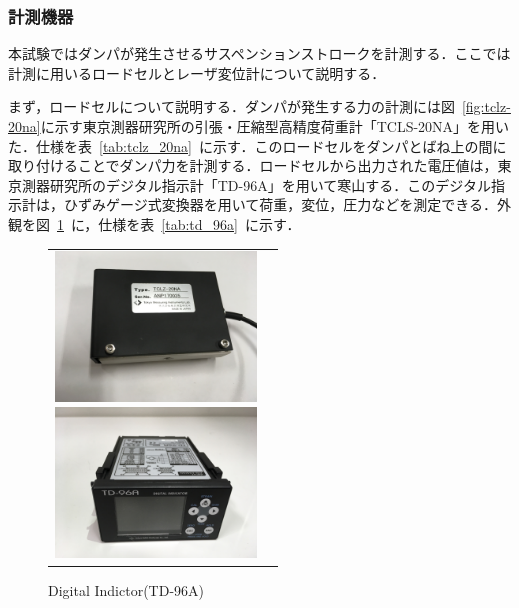 \documentclass[a4paper,12pt]{article_vdlab_sotsuron}
\begin{document}
\subsubsection{計測機器}
本試験ではダンパが発生させるサスペンションストロークを計測する．ここでは計測に用いるロードセルとレーザ変位計について説明する．

まず，ロードセルについて説明する．ダンパが発生する力の計測には図~\ref{fig:tclz-20na}に示す東京測器研究所の引張・圧縮型高精度荷重計「TCLS-20NA」を用いた．仕様を表~\ref{tab:tclz_20na}~に示す．このロードセルをダンパとばね上の間に取り付けることでダンパ力を計測する．ロードセルから出力された電圧値は，東京測器研究所のデジタル指示計「TD-96A」を用いて寒山する．このデジタル指示計は，ひずみゲージ式変換器を用いて荷重，変位，圧力などを測定できる．外観を図~\ref{fig:td_96a}~に，仕様を表~\ref{tab:td_96a}~に示す．


\vspace*{10mm}
\begin{figure}[h!]
  \begin{tabular}{cc}
  \begin{minipage}{0.5\hsize}
  \begin{center}
    \includegraphics[height=40mm]{figure/tclz_20na.eps}
      \vspace*{3mm}
      \caption{Loadcell(TCLZ-20NA)}
      \label{fig:tclz-20na}
    \end{center}
  \end{minipage}
  \begin{minipage}{0.5\hsize}
     \begin{center}
      \includegraphics[height=40mm]{figure/td_96a.eps}
      \vspace*{3mm}
      \caption{Digital Indictor(TD-96A)}
      \label{fig:td_96a}
    \end{center}
  \end{minipage}
  \end{tabular}
 \end{figure}
\end{document}
